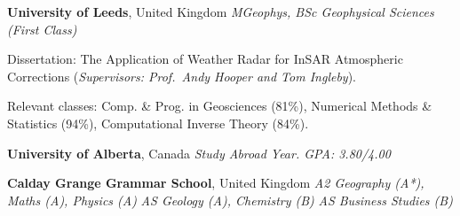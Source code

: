 %
\textbf{University of Leeds}, United Kingdom \newline
\emph{MGeophys, BSc Geophysical Sciences (First Class)} 
\begin{itemize*}
\item Dissertation: The Application of Weather Radar for InSAR Atmospheric
  Corrections (\emph{Supervisors: Prof.~Andy Hooper and Tom Ingleby}).
\item Relevant classes: Comp. \& Prog. in Geosciences (81\%), Numerical Methods
  \& Statistics (94\%), Computational Inverse Theory (84\%).
\end{itemize*}

\medskip
\textbf{University of Alberta}, Canada \newline
\emph{Study Abroad Year. GPA\@: 3.80/4.00} 

\medskip
\textbf{Calday Grange Grammar School}, United Kingdom \newline
\emph{A2 Geography (A*), Maths (A), Physics (A)}  \newline
\emph{AS Geology (A), Chemistry (B)} \newline
\emph{AS Business Studies (B)} 

\bigskip

